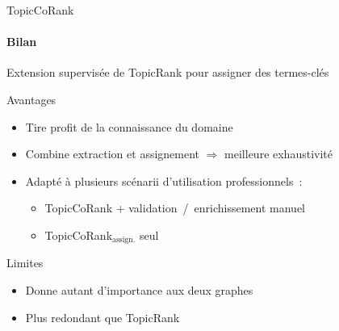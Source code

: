 \begin{frame}{TopicCoRank}\framesubtitle{Bilan}
  Extension supervisée de TopicRank pour assigner des termes-clés

  \vspace{1em}

  \begin{block}{Avantages}
    \begin{itemize}
      \item{Tire profit de la connaissance du domaine}
      \item{Combine extraction et assignement $\Rightarrow$ meilleure
            exhaustivité}
      \item{Adapté à plusieurs scénarii d'utilisation professionnels~:}
      \begin{itemize}
        \item{TopicCoRank + validation~/~enrichissement manuel}
        \item{TopicCoRank$_\text{assign.}$ seul}
      \end{itemize}
    \end{itemize}
  \end{block}

  \vspace{1em}

  \begin{alertblock}{Limites}
    \begin{itemize}
      \item{Donne autant d'importance aux deux graphes}
      \item{Plus redondant que TopicRank}
    \end{itemize}
  \end{alertblock}
\end{frame}

